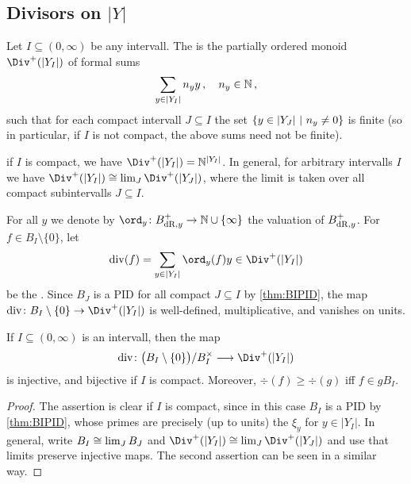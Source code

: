 \subsection{Divisors on \texorpdfstring{$|Y|$}{|Y|}}
\begin{defi}
	Let $I\subseteq (0,\infty)$ be any intervall. The  is the partially ordered monoid $\Div^+(|Y_I|)$ of formal sums
	\begin{equation*}
		\sum_{y\in|Y_I|}n_yy\,,\quad n_y\in\mathbb{N}\,,
	\end{equation*}
	such that for each compact intervall $J\subseteq I$ the set $\left\{y\in|Y_J|\ \middle|\  n_y\neq 0\right\}$ is finite (so in particular, if $I$ is not compact, the above sums need not be finite).
\end{defi}
\begin{exm}
	if $I$ is compact, we have $\Div^+(|Y_I|)=\IN^{|Y_I|}$. In general, for arbitrary intervalls $I$ we have $\Div^+(|Y_I|)\cong \limit_{J}\Div^+(|Y_J|)$, where the limit is taken over all compact subintervalls $J\subseteq I$.
\end{exm}
\begin{defi}\label{def:div}
	For all $y$ we denote by $\ord_y\colon B_{\dR,y}^+\morphism \IN\cup\{\infty\}$ the valuation of $B_{\mathrm{dR},y}^+$. For $f\in B_I\setminus\{0\}$, let
	\begin{equation*}
		\div(f)=\sum_{y\in|Y_I|}\ord_y(f)y\in \Div^+(|Y_I|)
	\end{equation*}
	be the . Since $B_J$ is a PID for all compact $J\subseteq I$ by \cref{thm:BIPID}, the map $\div\colon B_I\setminus\{0\}\morphism \Div^+(|Y_I|)$ is well-defined, multiplicative, and vanishes on units.
\end{defi}
\begin{prop}\label{prop:divInjective}
	If $I\subseteq (0,\infty)$ is an intervall, then the map
	\begin{equation*}
		\div\colon \big(B_I\setminus\{0\}\big)/B_I^\times\morphism \Div^+(|Y_I|)
	\end{equation*}
	is injective, and bijective if $I$ is compact. Moreover, $\div(f)\geq \div(g)$ iff $f\in gB_I$.
\end{prop}
\begin{proof}
	The assertion is clear if $I$ is compact, since in this case $B_I$ is a PID by \cref{thm:BIPID}, whose primes are precisely (up to units) the $\xi_y$ for $y\in |Y_I|$. In general, write $B_I\cong\operatorname*{lim}_JB_J$ and $\Div^+(|Y_I|)\cong \limit_J\Div^+(|Y_J|)$ and use that limits preserve injective maps. The second assertion can be seen in a similar way.
\end{proof}
